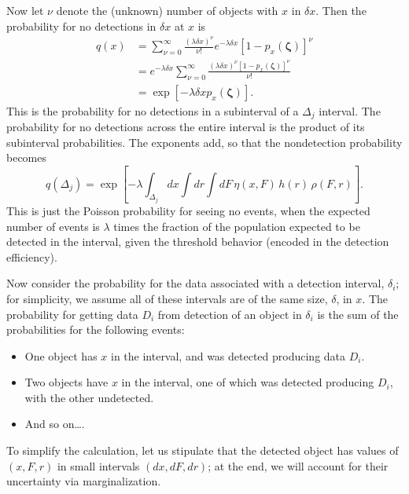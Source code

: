 \documentclass[12pt]{article}
\numberwithin{equation}{section}
\numberwithin{figure}{section}
\numberwithin{table}{section}
\newcommand{\rhopar}{\boldsymbol{\zeta}}
\newcommand{\effic}{\eta}
\begin{document}
Now let $\nu$ denote the (unknown) number of objects with $x$ in $\delta x$.
Then the probability for no detections in $\delta x$ at $x$ is
\begin{align}\label{eq:q-exp}
q(x) 
  &= \sum_{\nu=0}^\infty \frac{(\lambda\delta x)^\nu}{\nu!} e^{-\lambda\delta x}
        \left[1 - p_x(\rhopar)\right]^\nu\nonumber\\
  &= e^{-\lambda\delta x} \sum_{\nu=0}^\infty \frac{(\lambda\delta x)^\nu \left[1 - p_x(\rhopar)\right]^\nu}{\nu!}
          \nonumber\\
  &= \exp\left[-\lambda\delta x p_x(\rhopar)\right].
\end{align}
This is the probability for no detections in a subinterval of a $\Delta_j$ interval.
The probability for no detections across the entire interval is the product of its subinterval probabilities.
The exponents add, so that the nondetection probability becomes
\begin{equation}\label{eq:q-def}
q(\Delta_j) = \exp\left[-\lambda\int_{\Delta_j}dx \int dr \int dF\,\effic(x,F)\, h(r)\, \rho(F,r)\right].
\end{equation}
This is just the Poisson probability for seeing no events, when the expected number of events is $\lambda$ times the fraction of the population expected to be detected in the interval, given the threshold behavior (encoded in the detection efficiency).

Now consider the probability for the data associated with a detection interval, $\delta_i$; for simplicity, we assume all of these intervals are of the same size, $\delta$, in $x$.
The probability for getting data $D_i$ from detection of an object in $\delta_i$ is the sum of the probabilities for the following events:
\begin{itemize}
\item One object has $x$ in the interval, and was detected producing data $D_i$.
\item Two objects have $x$ in the interval, one of which was detected producing $D_i$, with the other undetected.
\item And so on\ldots.
\end{itemize}
To simplify the calculation, let us stipulate that the detected object has values of $(x,F,r)$ in small intervals $(dx, dF, dr)$; at the end, we will account for their uncertainty via marginalization.
\end{document}
